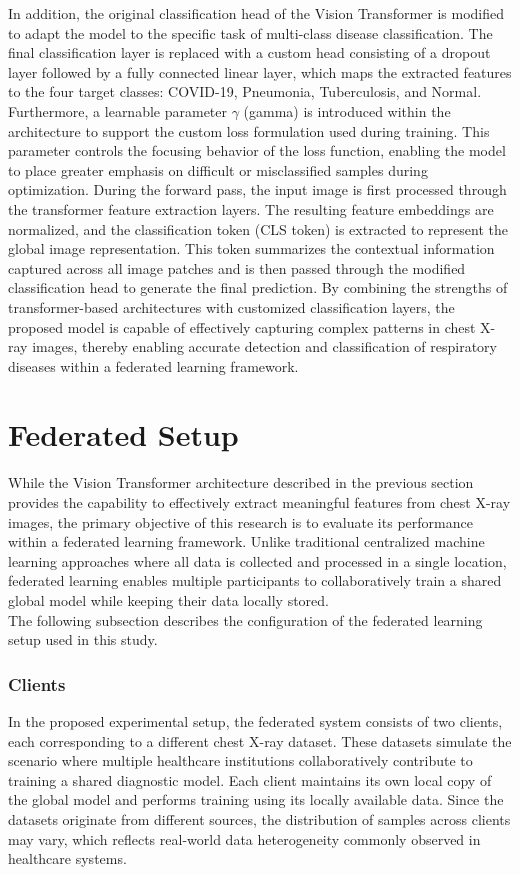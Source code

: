 \documentclass[12pt]{book}
\begin{document}
In addition, the original classification head of the Vision Transformer is modified to adapt the model to the specific task of multi-class disease classification. The final classification layer is replaced with a custom head consisting of a dropout layer followed by a fully connected linear layer, which maps the extracted features to the four target classes: COVID-19, Pneumonia, Tuberculosis, and Normal.
Furthermore, a learnable parameter $\gamma$ (gamma) is introduced within the architecture to support the custom loss formulation used during training. This parameter controls the focusing behavior of the loss function, enabling the model to place greater emphasis on difficult or misclassified samples during optimization.
During the forward pass, the input image is first processed through the transformer feature extraction layers. The resulting feature embeddings are normalized, and the classification token (CLS token) is extracted to represent the global image representation. This token summarizes the contextual information captured across all image patches and is then passed through the modified classification head to generate the final prediction.
By combining the strengths of transformer-based architectures with customized classification layers, the proposed model is capable of effectively capturing complex patterns in chest X-ray images, thereby enabling accurate detection and classification of respiratory diseases within a federated learning framework.



\section{Federated Setup}

While the Vision Transformer architecture described in the previous section provides the capability to effectively extract meaningful features from chest X-ray images, the primary objective of this research is to evaluate its performance within a federated learning framework. Unlike traditional centralized machine learning approaches where all data is collected and processed in a single location, federated learning enables multiple participants to collaboratively train a shared global model while keeping their data locally stored.
\\The following subsection describes the configuration of the federated learning setup used in this study.
\subsubsection{Clients}{}
In the proposed experimental setup, the federated system consists of two clients, each corresponding to a different chest X-ray dataset. These datasets simulate the scenario where multiple healthcare institutions collaboratively contribute to training a shared diagnostic model.
Each client maintains its own local copy of the global model and performs training using its locally available data. Since the datasets originate from different sources, the distribution of samples across clients may vary, which reflects real-world data heterogeneity commonly observed in healthcare systems.
\end{document}
